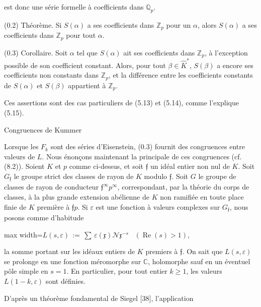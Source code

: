 \documentclass[11pt]{article}
\newcommand{\DFormula}[1]{\par\smallskip\noindent\begin{adjustbox}{max width=\linewidth}$\displaystyle #1$\end{adjustbox}\par\smallskip}
\begin{document}
\par
est donc une série formelle à coefficients dans \(\mathbb{Q}_{p}\).\par
\par
(0.2) Théorème. Si \(S(\alpha )\) a ses coefficients dans \(\mathbb{Z}_{p}\) pour un \(\alpha \), alors \(S(\alpha )\) a ses coefficients dans \(\mathbb{Z}_{p}\) pour tout \(\alpha \).\par
\par
(0.3) Corollaire. Soit \(\alpha \) tel que \(S(\alpha )\) ait ses coefficients dans \(\mathbb{Z}_{p}\), à l’exception possible de son coefficient constant. Alors, pour tout \(\beta \in \widehat{K}^{\ast}\), \(S(\beta )\) a encore ses coefficients non constants dans \(\mathbb{Z}_{p}\), et la différence entre les coefficients constants de \(S(\alpha )\) et \(S(\beta )\) appartient à \(\mathbb{Z}_{p}\).\par
\par
Ces assertions sont des cas particuliers de (5.13) et (5.14), comme l’explique (5.15).\par
\par
Congruences de Kummer\par
\par
Lorsque les \(F_{k}\) sont des séries d’Eisenstein, (0.3) fournit des congruences entre valeurs de \(L\). Nous énonçons maintenant la principale de ces congruences (cf. (8.2)). Soient \(K\) et \(p\) comme ci-dessus, et soit \(𝔣\) un idéal entier non nul de \(K\). Soit \(G_{𝔣}\) le groupe strict des classes de rayon de \(K\) modulo \(𝔣\). Soit \(G\) le groupe de classes de rayon de conducteur \(𝔣^{\infty }p^{\infty }\), correspondant, par la théorie du corps de classes, à la plus grande extension abélienne de \(K\) non ramifiée en toute place finie de \(K\) première à \(𝔣p\). Si \(\varepsilon \) est une fonction à valeurs complexes sur \(G_{𝔣}\), nous posons comme d’habitude\par
\par
\DFormula{L(s,\varepsilon )\,:=\,\sum \,\varepsilon (𝔵)\mathcal{N}𝔵^{-s}\,\,\,\,\,(\operatorname{Re}(s)>1),}
\par
la somme portant sur les idéaux entiers de \(K\) premiers à \(𝔣\). On sait que \(L(s,\varepsilon )\) se prolonge en une fonction méromorphe sur \(\mathbb{C}\), holomorphe sauf en un éventuel pôle simple en \(s=1\). En particulier, pour tout entier \(k\geq 1\), les valeurs \(L(1-k,\varepsilon )\) sont définies.\par
\par
D’après un théorème fondamental de Siegel [38], l’application\par
\end{document}
